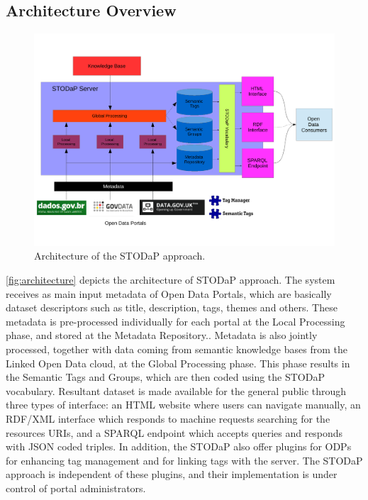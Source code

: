 \subsection{Architecture Overview}
\label{sec:stodap_architecture_overview}

\begin{figure}%
\begin{center}
\includegraphics[width=\columnwidth]{images/architecture.pdf}
\caption[Architecture of the STODaP approach.]{Architecture of the STODaP approach.}
\label{fig:architecture}
\end{center}
\end{figure}

\autoref{fig:architecture} depicts the architecture of STODaP approach.
The system receives as main input metadata of Open Data Portals, which are basically dataset descriptors such as title, description, tags, themes and others.
These metadata is pre-processed individually for each portal at the Local Processing phase, and stored at the Metadata Repository..
Metadata is also jointly processed, together with data coming from semantic knowledge bases from the Linked Open Data cloud, at the Global Processing phase.
This phase results in the Semantic Tags and Groups, which are then coded using the STODaP vocabulary.
Resultant dataset is made available for the general public through three types of interface: an HTML website where users can navigate manually, an RDF/XML interface which responds to machine requests searching for the resources URIs, and a SPARQL endpoint which accepts queries and responds with JSON coded triples.
In addition, the STODaP also offer plugins for ODPs for enhancing tag management and for linking tags with the server.
The STODaP approach is independent of these plugins, and their implementation is under control of portal administrators.

